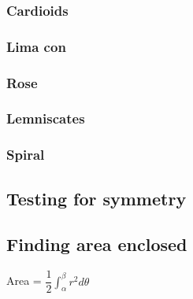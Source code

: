\subsubsection{Cardioids}
\subsubsection{Lima con}
\subsubsection{Rose}
\subsubsection{Lemniscates}
\subsubsection{Spiral}

\subsection{Testing for symmetry}


\subsection{Finding area enclosed}
Area = $\dfrac{1}{2}\int_{\alpha}^{\beta} r^2d\theta$
